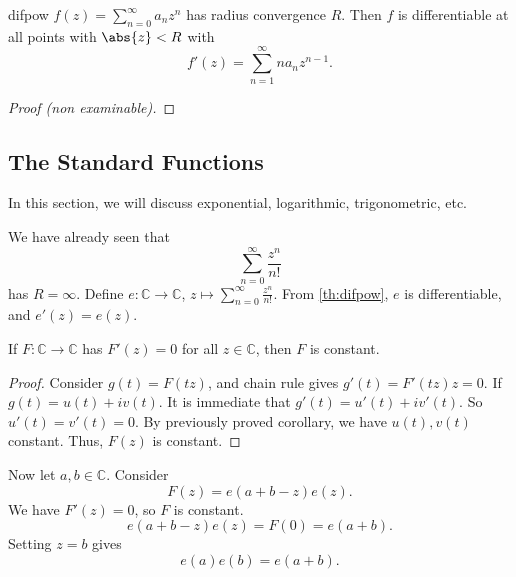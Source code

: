 \leavevmode
\begin{theorem}{}{difpow}
    \(f(z) = \sum\limits_{n=0}^{\infty} a_n z^n\) has radius convergence \(R\). Then \(f\) is differentiable at all points with \(\abs{z} < R\) with
    \[
        f'(z) = \sum\limits_{n=1}^{\infty} n a_n z^{n - 1}.
    \]
\end{theorem}
\begin{proof}[Proof (non examinable)]
\end{proof}
\subsection{The Standard Functions}
In this section, we will discuss exponential, logarithmic, trigonometric, etc.

We have already seen that
\[
    \sum\limits_{n=0}^{\infty} \frac{z^n}{n!}
\]
has \(R = \infty\). Define \(e: \mathbb{C} \to \mathbb{C}\), \(z \mapsto \sum\limits_{n=0}^{\infty} \frac{z^n}{n!}\). From \cref{th:difpow}, \(e\) is differentiable, and \(e'(z) = e(z)\).

If \(F: \mathbb{C}\to \mathbb{C}\) has \(F'(z) = 0\) for all \(z \in \mathbb{C}\), then \(F\) is constant.
\begin{proof}
    Consider \(g(t) = F(tz)\), and chain rule gives \(g'(t) = F'(tz)z = 0\). If \(g(t) = u(t) + iv(t)\). It is immediate that \(g'(t) = u'(t) + i v'(t)\). So \(u'(t) = v'(t) = 0\). By previously proved corollary, we have \(u(t), v(t)\) constant. Thus, \(F(z)\) is constant.
\end{proof}

Now let \(a, b \in \mathbb{C}\). Consider
\[
    F(z) = e(a + b - z)e(z).
\]
We have \(F'(z) = 0\), so \(F\) is constant.
\[
    e(a + b - z)e(z) = F(0) = e(a + b).
\]
Setting \(z = b\) gives
\[
    e(a)e(b) = e(a + b).
\]